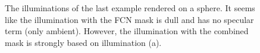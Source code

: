 \begin{figure}
	\centering
	
	\caption{The illuminations of the last example rendered on a sphere. It seems like the illumination with the FCN mask is dull and has no specular term (only ambient). However, the illumination with the combined mask is strongly based on illumination (a).}
	\label{fig:chap4:bsp1_illumination}
\end{figure}


